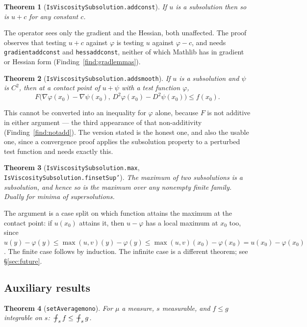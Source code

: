 \documentclass[11pt,reqno]{amsart}
\newcommand{\fint}{\mathop{\mathrlap{\,\rule[0.62ex]{0.62em}{0.5pt}}\int}}
\newcommand{\LEANREF}[1]{\texttt{\small\def\_{\textunderscore\allowbreak}#1}}
\newcommand{\avgint}{\fint}
\theoremstyle{plain}
\newtheorem{theorem}{Theorem}[section]
\theoremstyle{definition}
\begin{document}
\begin{theorem}[\LEANREF{IsViscositySubsolution.add\_const}]\label{thm:stab-const}
If $u$ is a subsolution then so is $u + c$ for any constant $c$.
\end{theorem}

The operator sees only the gradient and the Hessian, both unaffected. The proof
observes that testing $u+c$ against $\varphi$ is testing $u$ against
$\varphi - c$, and needs \LEANREF{gradient\_add\_const} and
\LEANREF{hess\_add\_const}, neither of which Mathlib has in gradient or Hessian
form (Finding~\ref{find:gradlemmas}).

\begin{theorem}[\LEANREF{IsViscositySubsolution.add\_smooth}]\label{thm:stab-smooth}
If $u$ is a subsolution and $\psi$ is $C^2$, then at a contact point of
$u + \psi$ with a test function $\varphi$,
\[
  F\bigl(\nabla\varphi(x_0) - \nabla\psi(x_0),\,
    D^2\varphi(x_0) - D^2\psi(x_0)\bigr) \le f(x_0).
\]
\end{theorem}

This cannot be converted into an inequality for $\varphi$ alone, because $F$ is
not additive in either argument --- the third appearance of that
non-additivity (Finding~\ref{find:notadd}). The version stated is the honest
one, and also the usable one, since a convergence proof applies the subsolution
property to a perturbed test function and needs exactly this.

\begin{theorem}[\LEANREF{IsViscositySubsolution.max},
\LEANREF{IsViscositySubsolution.finsetSup'}]\label{thm:stab-max}
The maximum of two subsolutions is a subsolution, and hence so is the maximum
over any nonempty finite family. Dually for minima of supersolutions.
\end{theorem}

The argument is a case split on which function attains the maximum at the
contact point: if $u(x_0)$ attains it, then $u - \varphi$ has a local maximum
at $x_0$ too, since
$u(y) - \varphi(y) \le \max(u,v)(y) - \varphi(y) \le \max(u,v)(x_0) -
\varphi(x_0) = u(x_0) - \varphi(x_0)$. The finite case follows by induction.
The infinite case is a different theorem; see \S\ref{sec:future}.

\subsection{Auxiliary results}

\begin{theorem}[\LEANREF{setAverage\_mono}]\label{thm:avgmono}
For $\mu$ a measure, $s$ measurable, and $f \le g$ integrable on $s$:
$\avgint_s f \le \avgint_s g$.
\end{theorem}
\end{document}
